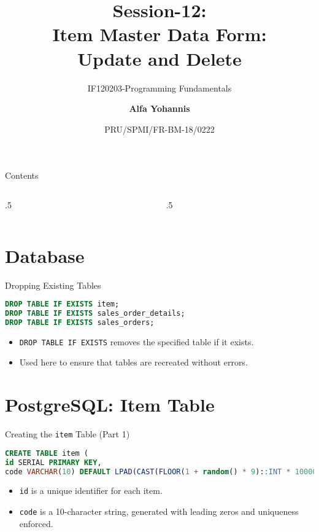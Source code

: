 \documentclass[aspectratio=169, table]{beamer}
\subtitle{IF120203-Programming Fundamentals}
\title{Session-12:\\\LARGE{Item Master Data Form:\\Update and Delete}}
\date[Serial]{\scriptsize {PRU/SPMI/FR-BM-18/0222}}
\author[Pradita]{\small{\textbf{Alfa Yohannis}}}
\begin{document}
\frame{\titlepage}

\begin{frame}{Contents}
\vspace{15pt}
\begin{columns}[t]
\begin{column}{.5\textwidth}
	\tableofcontents[sections={1-12}]
\end{column}
\begin{column}{.5\textwidth}
	\tableofcontents[sections={13-24}]
\end{column}
\end{columns}
\end{frame}


\section{Database}
\begin{frame}[fragile]{Dropping Existing Tables}

\begin{lstlisting}[language=Sql]
DROP TABLE IF EXISTS item;
DROP TABLE IF EXISTS sales_order_details;
DROP TABLE IF EXISTS sales_orders;
\end{lstlisting}

\begin{itemize}
\item \texttt{DROP TABLE IF EXISTS} removes the specified table if it exists.
\item Used here to ensure that tables are recreated without errors.
\end{itemize}
\end{frame}

\section{PostgreSQL: Item Table}
\begin{frame}[fragile]{Creating the \texttt{item} Table (Part 1)}
\vspace{15pt}
\begin{lstlisting}[language=Sql]
CREATE TABLE item (
id SERIAL PRIMARY KEY,
code VARCHAR(10) DEFAULT LPAD(CAST(FLOOR(1 + random() * 9)::INT * 1000000000 + FLOOR(random() * 1000000000)::INT AS VARCHAR), 10, '0') NOT NULL UNIQUE,
\end{lstlisting}

\begin{itemize}
\item \texttt{id} is a unique identifier for each item.
\item \texttt{code} is a 10-character string, generated with leading zeros and uniqueness enforced.
\end{itemize}
\end{frame}
\end{document}
